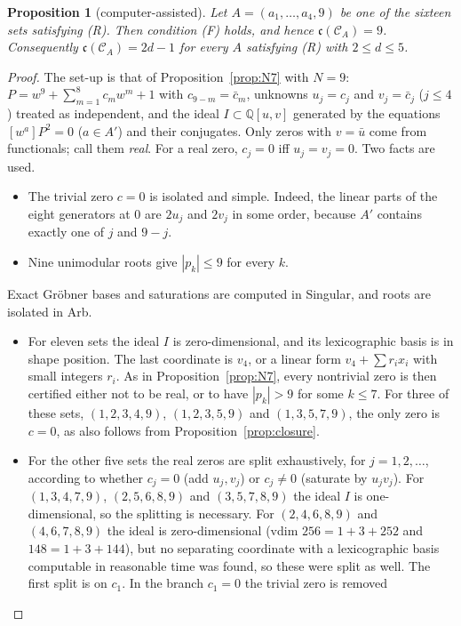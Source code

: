\documentclass[11pt]{amsart}
\newtheorem{proposition}[theorem]{Proposition}
\theoremstyle{remark}
\newcommand{\cc}{\mathfrak{c}}
\begin{document}
\begin{proposition}[computer-assisted]\label{prop:N9}
Let $A=(a_1,\dots,a_4,9)$ be one of the sixteen sets satisfying (R). Then condition (F) holds, and hence $\cc(\mathcal C_A)=9$. Consequently
$\cc(\mathcal C_A)=2d-1$ for every $A$ satisfying (R) with $2\le d\le5$.
\end{proposition}
\begin{proof}
The set-up is that of Proposition~\ref{prop:N7} with $N=9$: $P=w^9+\sum_{m=1}^8c_mw^m+1$ with $c_{9-m}=\bar c_m$, unknowns $u_j=c_j$ and $v_j=\bar c_j$
($j\le4$) treated as independent, and the ideal $I\subset\mathbb Q[u,v]$ generated by the equations $[w^a]P^2=0$ ($a\in A'$) and their conjugates.
Only zeros with $v=\bar u$ come from functionals; call them \emph{real}. For a real zero, $c_j=0$ iff $u_j=v_j=0$. Two facts are used.
\begin{itemize}
\item[(a)] The trivial zero $c=0$ is isolated and simple. Indeed, the linear parts of the eight generators at $0$ are $2u_j$ and $2v_j$ in some order, because $A'$
contains exactly one of $j$ and $9-j$.
\item[(b)] Nine unimodular roots give $|p_k|\le9$ for every $k$.
\end{itemize}
Exact Gr\"obner bases and saturations are computed in Singular, and roots are isolated in Arb.
\begin{itemize}
\item[(i)] For eleven sets the ideal $I$ is zero-dimensional, and its lexicographic basis is in shape position. The last coordinate is $v_4$, or a linear form
$v_4+\sum r_ix_i$ with small integers $r_i$. As in Proposition~\ref{prop:N7}, every nontrivial zero is then certified either not to be real, or to have
$|p_k|>9$ for some $k\le7$. For three of these sets, $(1,2,3,4,9)$, $(1,2,3,5,9)$ and $(1,3,5,7,9)$, the only zero is $c=0$, as also follows from
Proposition~\ref{prop:closure}.
\item[(ii)] For the other five sets the real zeros are split exhaustively, for $j=1,2,\dots$, according to whether $c_j=0$ (add $u_j,v_j$) or
$c_j\ne0$ (saturate by $u_jv_j$). For $(1,3,4,7,9)$, $(2,5,6,8,9)$ and $(3,5,7,8,9)$ the ideal $I$ is one-dimensional, so the splitting is necessary. For
$(2,4,6,8,9)$ and $(4,6,7,8,9)$ the ideal is zero-dimensional (vdim $256=1+3+252$ and $148=1+3+144$), but no separating coordinate with a lexicographic
basis computable in reasonable time was found, so these were split as well. The first split is on $c_1$. In the branch $c_1=0$ the trivial zero is removed

\end{itemize}
\end{proof}
\end{document}
